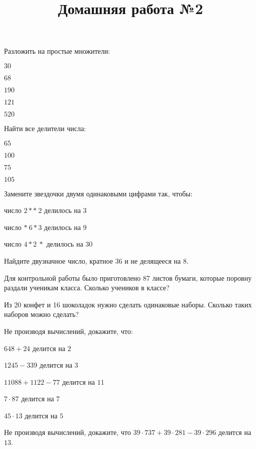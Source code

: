 \newpage
\title{Домашняя работа №2}
\begin{listofex}
	\item Разложить на простые множители:
	\begin{enumcols}[itemcolumns=5]
		\item \( 30 \)
		\item \( 68 \)
		\item \( 190 \)
		\item \( 121 \)
		\item \( 520 \)
	\end{enumcols}
	\item Найти все делители числа:
	\begin{enumcols}[itemcolumns=4]
		\item \( 65 \)
		\item \( 100 \)
		\item \( 75 \)
		\item \( 105 \)
	\end{enumcols}
	\item Замените звездочки двумя одинаковыми цифрами так, чтобы:
	\begin{enumcols}[itemcolumns=1]
		\item число \( 2**\:2 \) делилось на \( 3 \)
		\item число \( *\:6*3 \) делилось на \( 9 \)
		\item число \( 4*2\:* \) делилось на \( 30 \)
	\end{enumcols}
	\item Найдите двузначное число, кратное 36 и не делящееся на 8.
	\item Для контрольной работы было приготовлено 87 листов бумаги, которые поровну раздали ученикам класса. Сколько учеников в классе?
	\item Из 20 конфет и 16 шоколадок нужно сделать одинаковые наборы. Сколько таких наборов можно сделать?
	\item Не производя вычислений, докажите, что:
	\begin{enumcols}[itemcolumns=2]
		\item \( 648+24 \) делится на \( 2 \)
		\item \( 1245-339 \) делится на \( 3 \)
		\item \( 11088+1122-77 \) делится на \( 11 \)
		\item \( 7\cdot87 \) делится на \( 7 \)
		\item \( 45\cdot13 \) делится на \( 5 \)
	\end{enumcols}
	\item Не производя вычислений, докажите, что \( 39\cdot737+39\cdot281-39\cdot296 \) делится на \( 13 \).

\end{listofex}
